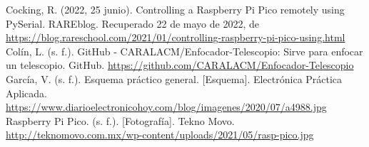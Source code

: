 \documentclass{article}
\begin{document}
    \newpage
    \renewcommand{\bibname}{Referencias utilizadas.}
    \begin{thebibliography}{X}
         Cocking, R. (2022, 25 junio). Controlling a Raspberry Pi Pico remotely using PySerial. RAREblog. Recuperado 22 de mayo de 2022, de \url{https://blog.rareschool.com/2021/01/controlling-raspberry-pi-pico-using.html}
    	 Colín, L. (s. f.). GitHub - CARALACM/Enfocador-Telescopio: Sirve para enfocar un telescopio. GitHub. \url{https://github.com/CARALACM/Enfocador-Telescopio}
         García, V. (s. f.). Esquema práctico general. [Esquema]. Electrónica Práctica Aplicada. \url{https://www.diarioelectronicohoy.com/blog/imagenes/2020/07/a4988.jpg}
         Raspberry Pi Pico. (s. f.). [Fotografía]. Tekno Movo. \url{http://teknomovo.com.mx/wp-content/uploads/2021/05/rasp-pico.jpg}
    \end{thebibliography}
    
\end{document}
